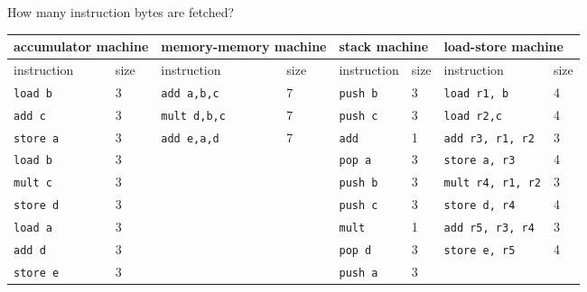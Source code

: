 \documentclass{article}
\begin{document}
\subsubsection{}
How many instruction bytes are fetched?\\
\begin{tabular}{l|ll|ll|ll|l|}
\hline
\multicolumn{2}{|l|}{accumulator machine} & \multicolumn{2}{|l|}{memory-memory machine} & \multicolumn{2}{|l|}{stack machine} & \multicolumn{2}{|l|}{load-store machine} \\ \hline
\multicolumn{1}{|l|}{instruction} & size & \multicolumn{1}{|l|}{instruction} & size & \multicolumn{1}{|l|}{instruction} & size & \multicolumn{1}{|l|}{instruction} & size \\ \hline
\multicolumn{1}{|l|}{\texttt{load b}} & 3 & \multicolumn{1}{|l|}{\texttt{add a,b,c}} & 7 & \multicolumn{1}{|l|}{\texttt{push b}} & 3 &\multicolumn{1}{|l|}{\texttt{load r1, b}} & 4 \\ 
\multicolumn{1}{|l|}{\texttt{add c}} & 3 &\multicolumn{1}{|l|}{\texttt{mult d,b,c}} & 7 & \multicolumn{1}{|l|}{\texttt{push c}} & 3 & \multicolumn{1}{|l|}{\texttt{load r2,c}} & 4 \\
\multicolumn{1}{|l|}{\texttt{store a}} & 3 & \multicolumn{1}{|l|}{\texttt{add e,a,d}} & 7 & \multicolumn{1}{|l|}{\texttt{add}} & 1 & \multicolumn{1}{|l|}{\texttt{add r3, r1, r2}} & 3\\
\multicolumn{1}{|l|}{\texttt{load b}} & 3 & \multicolumn{1}{|l|}{} & & \multicolumn{1}{|l|}{\texttt{pop a}} & 3 & \multicolumn{1}{|l|}{\texttt{store a, r3}} & 4\\
\multicolumn{1}{|l|}{\texttt{mult c}} & 3 & \multicolumn{1}{|l|}{} & & \multicolumn{1}{|l|}{\texttt{push b}} & 3 & \multicolumn{1}{|l|}{\texttt{mult r4, r1, r2}} & 3 \\
\multicolumn{1}{|l|}{\texttt{store d}} & 3 & \multicolumn{1}{|l|}{} & &\multicolumn{1}{|l|}{\texttt{push c}} & 3 & \multicolumn{1}{|l|}{\texttt{store d, r4}} & 4\\ 
\multicolumn{1}{|l|}{\texttt{load a}} & 3 & \multicolumn{1}{|l|}{} & & \multicolumn{1}{|l|}{\texttt{mult}} & 1 & \multicolumn{1}{|l|}{\texttt{add r5, r3, r4}} & 3 \\
\multicolumn{1}{|l|}{\texttt{add d}} & 3 & \multicolumn{1}{|l|}{} & & \multicolumn{1}{|l|}{\texttt{pop d}} & 3 & \multicolumn{1}{|l|}{\texttt{store e, r5}} & 4\\
\multicolumn{1}{|l|}{\texttt{store e}} & 3 & \multicolumn{1}{|l|}{} & & \multicolumn{1}{|l|}{\texttt{push a}} & 3 & \multicolumn{1}{|l|}{} & \\

\end{tabular}
\end{document}
